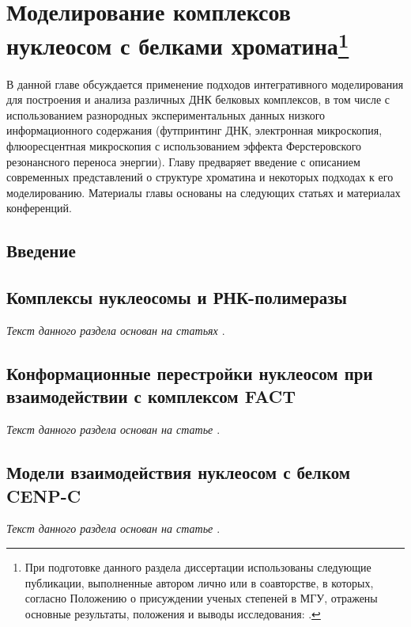 \chapter[Моделирование комплексов нуклеосом с белками хроматина]{Моделирование комплексов нуклеосом с белками хроматина\footnote{При подготовке данного раздела диссертации использованы следующие публикации, выполненные автором лично или в соавторстве, в которых, согласно Положению о присуждении ученых степеней в МГУ, отражены основные результаты, положения и выводы исследования: \cite{xiao_molecular_2017,gaykalova_structural_2015,valieva_large-scale_2016,gorkovets_joint_2018,bass_effect_2019,armeev_modeling_2016}.}} \label{part6_nucl_complex}

В данной главе обсуждается применение подходов интегративного моделирования для построения и анализа различных ДНК белковых комплексов, в том числе с использованием разнородных экспериментальных данных низкого информационного содержания (футпринтинг ДНК, электронная микроскопия, флюоресцентная микроскопия с использованием эффекта Ферстеровского резонансного переноса энергии). Главу предваряет введение с описанием современных представлений о структуре хроматина и некоторых подходах к его моделированию.
Материалы главы основаны на следующих статьях \cite{xiao_molecular_2017,gaykalova_structural_2015,chang_structural_2013,valieva_large-scale_2016,gorkovets_joint_2018,bass_effect_2019} и материалах конференций\cite{gorkovets_mutual_2018}.

\section{Введение}



\section{Комплексы нуклеосомы и РНК-полимеразы}
\textit{Текст данного раздела основан на статьях \cite{gaykalova_structural_2015,chang_structural_2013}}.


\section{Конформационные перестройки нуклеосом при взаимодействии с комплексом FACT}
\textit{Текст данного раздела основан на статье \cite{valieva_large-scale_2016}}.


\section{Модели взаимодействия нуклеосом с белком CENP-C}
\textit{Текст данного раздела основан на статье \cite{xiao_molecular_2017}}.


